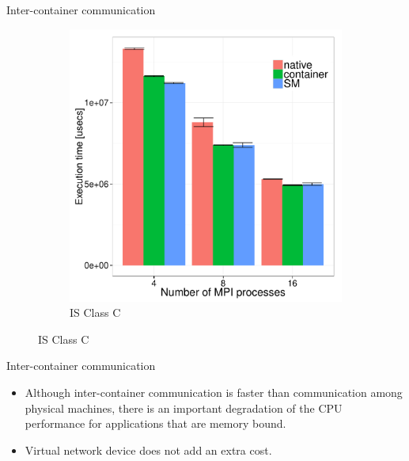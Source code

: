 \documentclass[presentation]{beamer}
\begin{document}
\begin{frame}[label=sec-3-5]{Inter-container communication}
\begin{figure}[H]
\begin{subfigure}[b]{0.42\textwidth}
    \includegraphics[scale=0.25,angle=0]{figures/inter-container-isC.pdf}
    \caption{IS Class C}
  \end{subfigure}
\end{figure}
\end{frame}

\begin{frame}[label=sec-3-6]{Inter-container communication}
\begin{itemize}
\item Although inter-container communication is faster
than communication among physical machines, there is an important degradation
of the CPU performance for applications that are memory bound.

\item Virtual network device does not add an extra cost.
\end{itemize}
\end{frame}
\end{document}
